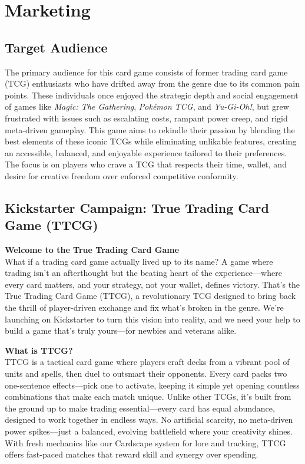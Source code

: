 \chapter{Marketing}




\section{Target Audience}
The primary audience for this card game consists of former trading card game (TCG) enthusiasts who have drifted away from the genre due to its common pain points. These individuals once enjoyed the strategic depth and social engagement of games like \textit{Magic: The Gathering}, \textit{Pokémon TCG}, and \textit{Yu-Gi-Oh!}, but grew frustrated with issues such as escalating costs, rampant power creep, and rigid meta-driven gameplay. This game aims to rekindle their passion by blending the best elements of these iconic TCGs while eliminating unlikable features, creating an accessible, balanced, and enjoyable experience tailored to their preferences. The focus is on players who crave a TCG that respects their time, wallet, and desire for creative freedom over enforced competitive conformity.




\section{Kickstarter Campaign: True Trading Card Game (TTCG)}

\textbf{Welcome to the True Trading Card Game} \\
What if a trading card game actually lived up to its name? A game where trading isn’t an afterthought but the beating heart of the experience—where every card matters, and your strategy, not your wallet, defines victory. That’s the True Trading Card Game (TTCG), a revolutionary TCG designed to bring back the thrill of player-driven exchange and fix what’s broken in the genre. We’re launching on Kickstarter to turn this vision into reality, and we need your help to build a game that’s truly yours—for newbies and veterans alike.

\textbf{What is TTCG?} \\
TTCG is a tactical card game where players craft decks from a vibrant pool of units and spells, then duel to outsmart their opponents. Every card packs two one-sentence effects—pick one to activate, keeping it simple yet opening countless combinations that make each match unique. Unlike other TCGs, it’s built from the ground up to make trading essential—every card has equal abundance, designed to work together in endless ways. No artificial scarcity, no meta-driven power spikes—just a balanced, evolving battlefield where your creativity shines. With fresh mechanics like our Cardscape system for lore and tracking, TTCG offers fast-paced matches that reward skill and synergy over spending.

